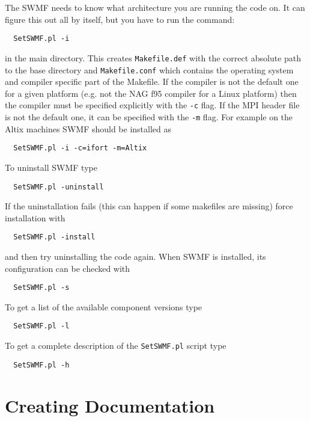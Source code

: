The SWMF needs to know what architecture you are running the code on.
It can figure this out all by itself, but you have to run the command:
\begin{verbatim}
  SetSWMF.pl -i
\end{verbatim}
in the main directory. This creates {\tt Makefile.def} with
the correct absolute path to the base directory and {\tt Makefile.conf}
which contains the operating system and compiler specific part of
the Makefile. If the compiler is not the default one for a given
platform (e.g. not the NAG f95 compiler for a Linux platform) then
the compiler must be specified explicitly with the {\tt -c}
flag. If the MPI header file is not the default one, it can be
specified with the {\tt -m} flag. For example on the Altix machines
SWMF should be installed as
\begin{verbatim}
  SetSWMF.pl -i -c=ifort -m=Altix
\end{verbatim}
To uninstall SWMF type
\begin{verbatim}
  SetSWMF.pl -uninstall
\end{verbatim}
If the uninstallation fails (this can happen if some makefiles are missing)
force installation with
\begin{verbatim}
  SetSWMF.pl -install
\end{verbatim}
and then try uninstalling the code again.
When SWMF is installed, its configuration can be checked with
\begin{verbatim}
  SetSWMF.pl -s
\end{verbatim}
To get a list of the available component versions type
\begin{verbatim}
  SetSWMF.pl -l
\end{verbatim}
To get a complete description of the {\tt SetSWMF.pl}  script type
\begin{verbatim}
  SetSWMF.pl -h
\end{verbatim}

\section{Creating Documentation}

